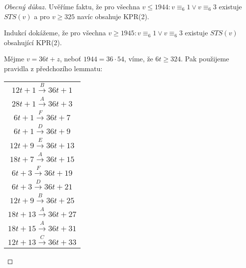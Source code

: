 \begin{proof}[Obecný  důkaz]
    Uvěříme faktu, že pro všechna $v\leq 1944: v\equiv_6 1\lor v\equiv_6 3$ existuje $STS(v)$ a pro $v\geq 325$ navíc obsahuje KPR(2).

    Indukcí dokážeme, že pro všechna $v\geq 1945: v\equiv_6 1\lor v\equiv_6 3$ existuje $STS(v)$ obsahující KPR(2).

    Mějme $v=36t+z$, neboť $1944=36\cdot 54$, víme, že $6t\geq 324$.
    Pak použijeme pravidla z předchozího lemmatu:
    \begin{tabular}{c}
        $12t+1\overset{B}{\rightarrow}36t+1$\\
        $28t+1\overset{A}{\rightarrow}36t+3$\\
        $6t+1\overset{F}{\rightarrow}36t+7$\\
        $6t+1\overset{D}{\rightarrow}36t+9$\\
        $12t+9\overset{E}{\rightarrow}36t+13$\\
        $18t+7\overset{A}{\rightarrow}36t+15$\\
        $6t+3\overset{F}{\rightarrow}36t+19$\\
        $6t+3\overset{D}{\rightarrow}36t+21$\\
        $12t+9\overset{B}{\rightarrow}36t+25$\\
        $18t+13\overset{A}{\rightarrow}36t+27$\\
        $18t+15\overset{A}{\rightarrow}36t+31$\\
        $12t+13\overset{C}{\rightarrow}36t+33$
    \end{tabular}
\end{proof}
